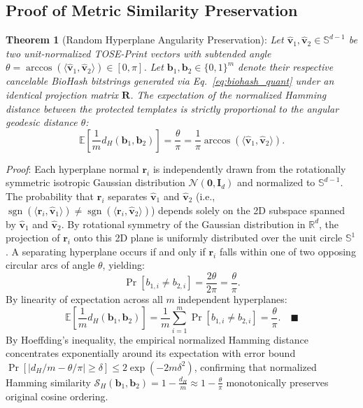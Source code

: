 \documentclass[lettersize,journal]{IEEEtran}
\begin{document}
\subsection{Proof of Metric Similarity Preservation}
\textbf{Theorem 1} (Random Hyperplane Angularity Preservation): \textit{Let $\hat{\mathbf{v}}_1, \hat{\mathbf{v}}_2 \in \mathbb{S}^{d-1}$ be two unit-normalized TOSE-Print vectors with subtended angle $\theta = \arccos(\langle \hat{\mathbf{v}}_1, \hat{\mathbf{v}}_2 \rangle) \in [0, \pi]$. Let $\mathbf{b}_1, \mathbf{b}_2 \in \{0, 1\}^m$ denote their respective cancelable BioHash bitstrings generated via Eq.~\eqref{eq:biohash_quant} under an identical projection matrix $\mathbf{R}$. The expectation of the normalized Hamming distance between the protected templates is strictly proportional to the angular geodesic distance $\theta$:}
\begin{equation}
    \mathbb{E}\left[ \frac{1}{m} d_H(\mathbf{b}_1, \mathbf{b}_2) \right] = \frac{\theta}{\pi} = \frac{1}{\pi} \arccos(\langle \hat{\mathbf{v}}_1, \hat{\mathbf{v}}_2 \rangle).
    \label{eq:angular_preservation}
\end{equation}

\textit{Proof}: Each hyperplane normal $\mathbf{r}_i$ is independently drawn from the rotationally symmetric isotropic Gaussian distribution $\mathcal{N}(\mathbf{0}, \mathbf{I}_d)$ and normalized to $\mathbb{S}^{d-1}$. The probability that $\mathbf{r}_i$ separates $\hat{\mathbf{v}}_1$ and $\hat{\mathbf{v}}_2$ (i.e., $\operatorname{sgn}(\langle \mathbf{r}_i, \hat{\mathbf{v}}_1 \rangle) \ne \operatorname{sgn}(\langle \mathbf{r}_i, \hat{\mathbf{v}}_2 \rangle)$) depends solely on the 2D subspace spanned by $\hat{\mathbf{v}}_1$ and $\hat{\mathbf{v}}_2$. By rotational symmetry of the Gaussian distribution in $\mathbb{R}^d$, the projection of $\mathbf{r}_i$ onto this 2D plane is uniformly distributed over the unit circle $\mathbb{S}^1$. A separating hyperplane occurs if and only if $\mathbf{r}_i$ falls within one of two opposing circular arcs of angle $\theta$, yielding:
\begin{equation}
    \Pr[b_{1, i} \ne b_{2, i}] = \frac{2\theta}{2\pi} = \frac{\theta}{\pi}.
\end{equation}
By linearity of expectation across all $m$ independent hyperplanes:
\begin{equation}
    \mathbb{E}\left[ \frac{1}{m} d_H(\mathbf{b}_1, \mathbf{b}_2) \right] = \frac{1}{m} \sum_{i=1}^m \Pr[b_{1, i} \ne b_{2, i}] = \frac{\theta}{\pi}. \quad \blacksquare
\end{equation}
By Hoeffding's inequality, the empirical normalized Hamming distance concentrates exponentially around its expectation with error bound $\Pr[|d_H/m - \theta/\pi| \ge \delta] \le 2\exp(-2m\delta^2)$, confirming that normalized Hamming similarity $\mathcal{S}_H(\mathbf{b}_1, \mathbf{b}_2) = 1 - \frac{d_H}{m} \approx 1 - \frac{\theta}{\pi}$ monotonically preserves original cosine ordering.
\end{document}
